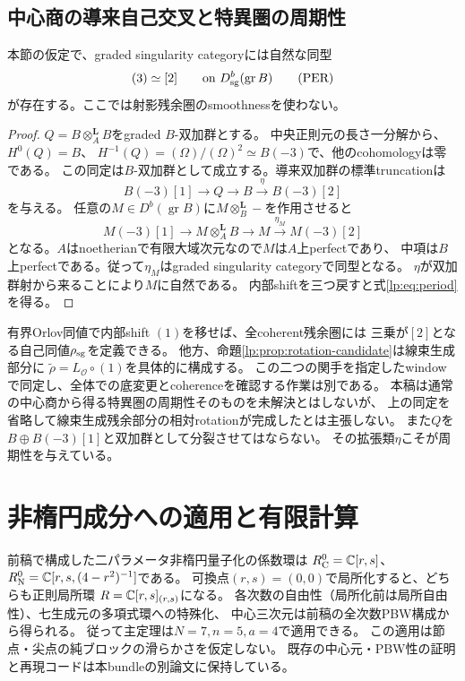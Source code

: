 \subsection{中心商の導来自己交叉と特異圏の周期性}
\begin{proposition}[三次周期性の代数的な構成]\label{lp:prop:sing-period}
本節の仮定で、graded singularity categoryには自然な同型
\[
 (3)\simeq[2]
 \qquad\text{on }D_{\rm sg}^b(\operatorname{gr}B)
 \tag{PER}\label{lp:eq:period}
\]
が存在する。ここでは射影残余圏のsmoothnessを使わない。
\end{proposition}
\begin{proof}
$Q=B\otimes_A^{\mathbf L}B$をgraded $B$-双加群とする。
中央正則元の長さ一分解から、$H^0(Q)=B$、
$H^{-1}(Q)=(\Omega)/(\Omega)^2\simeq B(-3)$で、他のcohomologyは零である。
この同定は$B$-双加群として成立する。導来双加群の標準truncationは
\[
 B(-3)[1]\longrightarrow Q\longrightarrow B
 \xrightarrow{\eta}B(-3)[2]
\]
を与える。
任意の$M\in D^b(\operatorname{gr}B)$に$M\otimes_B^{\mathbf L}-$を作用させると
\[
 M(-3)[1]\longrightarrow M\otimes_A^{\mathbf L}B\longrightarrow M
 \xrightarrow{\eta_M}M(-3)[2]
\]
となる。$A$はnoetherianで有限大域次元なので$M$は$A$上perfectであり、
中項は$B$上perfectである。従って$\eta_M$はgraded singularity categoryで同型となる。
$\eta$が双加群射から来ることにより$M$に自然である。
内部shiftを三つ戻すと式\eqref{lp:eq:period}を得る。
\end{proof}
\begin{remark}[二種類のrotationを混同しない]
有界Orlov同値で内部shift $(1)$を移せば、全coherent残余圏には
三乗が$[2]$となる自己同値$\rho_{\rm sg}$を定義できる。
他方、命題\ref{lp:prop:rotation-candidate}は線束生成部分に
$\widetilde\rho=L_{\mathcal O}\circ(1)$を具体的に構成する。
この二つの関手を指定したwindowで同定し、全体での底変更とcoherenceを確認する作業は別である。
本稿は通常の中心商から得る特異圏の周期性そのものを未解決とはしないが、
上の同定を省略して線束生成残余部分の相対rotationが完成したとは主張しない。
また$Q$を$B\oplus B(-3)[1]$と双加群として分裂させてはならない。
その拡張類$\eta$こそが周期性を与えている。
\end{remark}

\section{非楕円成分への適用と有限計算}
\label{lp:sec:application}
前稿で構成した二パラメータ非楕円量子化の係数環は
$R_{\mathrm C}^0=\mathbb C[r,s]$、$R_{\mathrm N}^0=\mathbb C[r,s,(4-r^2)^{-1}]$である。
可換点$(r,s)=(0,0)$で局所化すると、どちらも正則局所環
$R=\mathbb C[r,s]_{(r,s)}$になる。
各次数の自由性（局所化前は局所自由性）、七生成元の多項式環への特殊化、
中心三次元は前稿の全次数PBW構成から得られる。
従って主定理は$N=7,n=5,a=4$で適用できる。
この適用は節点・尖点の純ブロックの滑らかさを仮定しない。
既存の中心元・PBW性の証明と再現コードは本bundleの別論文に保持している。

